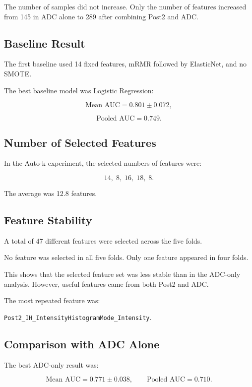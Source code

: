 \documentclass[10pt,a4paper]{article}
\begin{document}
The number of samples did not increase. Only the number of features increased from 145 in ADC alone to 289 after combining Post2 and ADC.

\subsection{Baseline Result}

The first baseline used 14 fixed features, mRMR followed by ElasticNet, and no SMOTE.

The best baseline model was Logistic Regression:

\[
\text{Mean AUC}=0.801\pm0.072,
\]

\[
\text{Pooled AUC}=0.749.
\]



\subsection{Number of Selected Features}

In the Auto-k experiment, the selected numbers of features were:

\[
14,\;8,\;16,\;18,\;8.
\]

The average was 12.8 features.


\subsection{Feature Stability}

A total of 47 different features were selected across the five folds.

No feature was selected in all five folds. Only one feature appeared in four folds.

This shows that the selected feature set was less stable than in the ADC-only analysis. However, useful features came from both Post2 and ADC.

The most repeated feature was:

\begin{center}
\texttt{Post2\_IH\_IntensityHistogramMode\_Intensity}.
\end{center}

\subsection{Comparison with ADC Alone}

The best ADC-only result was:

\[
\text{Mean AUC}=0.771\pm0.038,
\qquad
\text{Pooled AUC}=0.710.
\]
\end{document}
